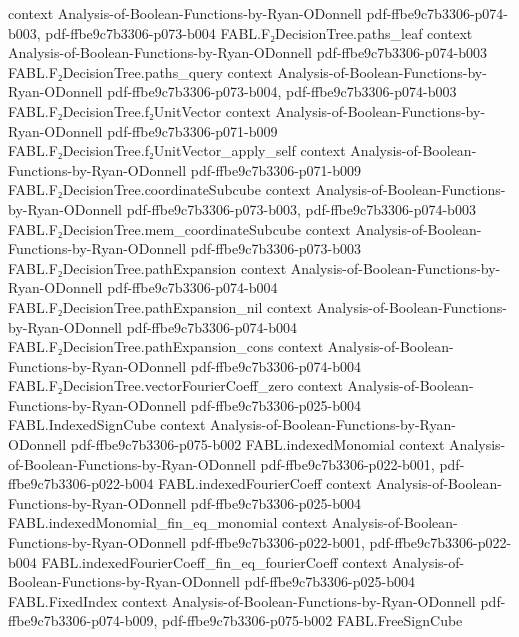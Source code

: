 \begin{theorem}
  {context}
  {Analysis-of-Boolean-Functions-by-Ryan-ODonnell}
  {pdf-ffbe9c7b3306-p074-b003,
    pdf-ffbe9c7b3306-p073-b004}
\proofstep
  {FABL.F₂DecisionTree.paths_leaf}
  {context}
  {Analysis-of-Boolean-Functions-by-Ryan-ODonnell}
  {pdf-ffbe9c7b3306-p074-b003}
\proofstep
  {FABL.F₂DecisionTree.paths_query}
  {context}
  {Analysis-of-Boolean-Functions-by-Ryan-ODonnell}
  {pdf-ffbe9c7b3306-p073-b004,
    pdf-ffbe9c7b3306-p074-b003}
\proofstep
  {FABL.F₂DecisionTree.f₂UnitVector}
  {context}
  {Analysis-of-Boolean-Functions-by-Ryan-ODonnell}
  {pdf-ffbe9c7b3306-p071-b009}
\proofstep
  {FABL.F₂DecisionTree.f₂UnitVector_apply_self}
  {context}
  {Analysis-of-Boolean-Functions-by-Ryan-ODonnell}
  {pdf-ffbe9c7b3306-p071-b009}
\proofstep
  {FABL.F₂DecisionTree.coordinateSubcube}
  {context}
  {Analysis-of-Boolean-Functions-by-Ryan-ODonnell}
  {pdf-ffbe9c7b3306-p073-b003,
    pdf-ffbe9c7b3306-p074-b003}
\proofstep
  {FABL.F₂DecisionTree.mem_coordinateSubcube}
  {context}
  {Analysis-of-Boolean-Functions-by-Ryan-ODonnell}
  {pdf-ffbe9c7b3306-p073-b003}
\proofstep
  {FABL.F₂DecisionTree.pathExpansion}
  {context}
  {Analysis-of-Boolean-Functions-by-Ryan-ODonnell}
  {pdf-ffbe9c7b3306-p074-b004}
\proofstep
  {FABL.F₂DecisionTree.pathExpansion_nil}
  {context}
  {Analysis-of-Boolean-Functions-by-Ryan-ODonnell}
  {pdf-ffbe9c7b3306-p074-b004}
\proofstep
  {FABL.F₂DecisionTree.pathExpansion_cons}
  {context}
  {Analysis-of-Boolean-Functions-by-Ryan-ODonnell}
  {pdf-ffbe9c7b3306-p074-b004}
\proofstep
  {FABL.F₂DecisionTree.vectorFourierCoeff_zero}
  {context}
  {Analysis-of-Boolean-Functions-by-Ryan-ODonnell}
  {pdf-ffbe9c7b3306-p025-b004}
\proofstep
  {FABL.IndexedSignCube}
  {context}
  {Analysis-of-Boolean-Functions-by-Ryan-ODonnell}
  {pdf-ffbe9c7b3306-p075-b002}
\proofstep
  {FABL.indexedMonomial}
  {context}
  {Analysis-of-Boolean-Functions-by-Ryan-ODonnell}
  {pdf-ffbe9c7b3306-p022-b001,
    pdf-ffbe9c7b3306-p022-b004}
\proofstep
  {FABL.indexedFourierCoeff}
  {context}
  {Analysis-of-Boolean-Functions-by-Ryan-ODonnell}
  {pdf-ffbe9c7b3306-p025-b004}
\proofstep
  {FABL.indexedMonomial_fin_eq_monomial}
  {context}
  {Analysis-of-Boolean-Functions-by-Ryan-ODonnell}
  {pdf-ffbe9c7b3306-p022-b001,
    pdf-ffbe9c7b3306-p022-b004}
\proofstep
  {FABL.indexedFourierCoeff_fin_eq_fourierCoeff}
  {context}
  {Analysis-of-Boolean-Functions-by-Ryan-ODonnell}
  {pdf-ffbe9c7b3306-p025-b004}
\proofstep
  {FABL.FixedIndex}
  {context}
  {Analysis-of-Boolean-Functions-by-Ryan-ODonnell}
  {pdf-ffbe9c7b3306-p074-b009,
    pdf-ffbe9c7b3306-p075-b002}
\proofstep
  {FABL.FreeSignCube}

\end{theorem}
